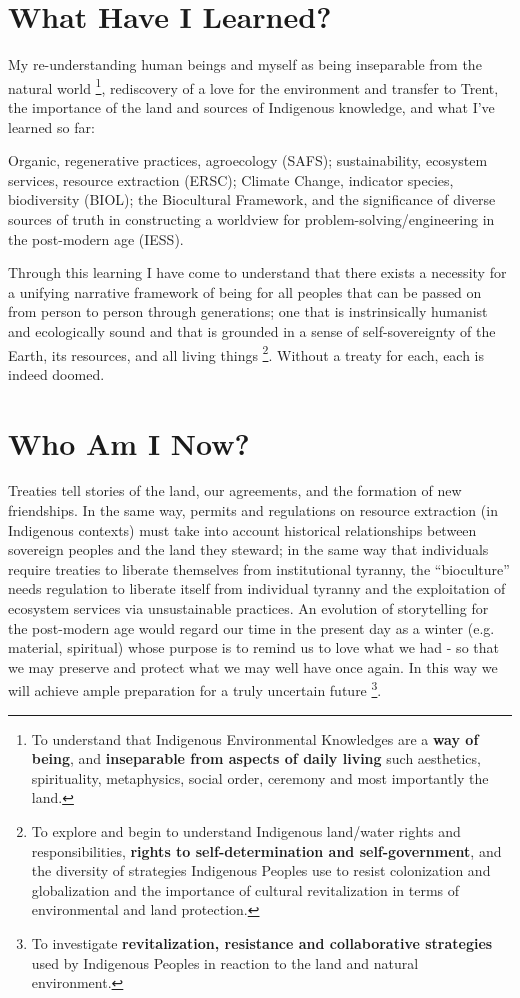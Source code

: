 \documentclass{report}
\begin{document}
\section{What Have I Learned?}

My re-understanding human beings and myself as being inseparable from the natural world \footnote{To understand that Indigenous Environmental Knowledges are a \textbf{way of being}, and \textbf{inseparable from aspects of daily living} such aesthetics, spirituality, metaphysics, social order, ceremony and most importantly the land.}, rediscovery of a love for the environment and transfer to Trent, the importance of the land and sources of Indigenous knowledge, and what I've learned so far:

Organic, regenerative practices, agroecology (SAFS); sustainability, ecosystem services, resource extraction (ERSC); Climate Change, indicator species, biodiversity (BIOL); the Biocultural Framework, and the significance of diverse sources of truth in constructing a worldview for problem-solving/engineering in the post-modern age (IESS).

Through this learning I have come to understand that there exists a necessity for a unifying narrative framework of being for all peoples that can be passed on from person to person through generations; one that is instrinsically humanist and ecologically sound and that is grounded in a sense of self-sovereignty of the Earth, its resources, and all living things \footnote{To explore and begin to understand Indigenous land/water rights and responsibilities, \textbf{rights to self-determination and self-government}, and the diversity of strategies Indigenous Peoples use to resist colonization and globalization and the importance of cultural revitalization in terms of environmental and land protection.}. Without a treaty for each, each is indeed doomed.

\section{Who Am I Now?}

Treaties tell stories of the land, our agreements, and the formation of new friendships. In the same way, permits and regulations on resource extraction (in Indigenous contexts) must take into account historical relationships between sovereign peoples and the land they steward; in the same way that individuals require treaties to liberate themselves from institutional tyranny, the ``bioculture'' needs regulation to liberate itself from individual tyranny and the exploitation of ecosystem services via unsustainable practices. An evolution of storytelling for the post-modern age would regard our time in the present day as a winter (e.g. material, spiritual) whose purpose is to remind us to love what we had - so that we may preserve and protect what we may well have once again. In this way we will achieve ample preparation for a truly uncertain future \footnote{To investigate \textbf{revitalization, resistance and collaborative strategies} used by Indigenous Peoples in reaction to the land and natural environment. }.
\end{document}
